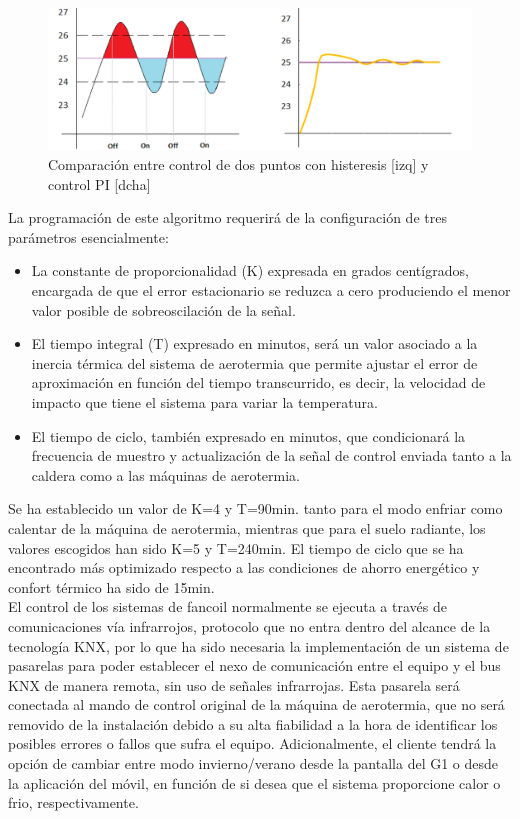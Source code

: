 \bigskip
\begin{figure}[H]
\includegraphics[width=1.15\textwidth]{figures/metodos_control.png}   
\caption{Comparación entre control de dos puntos con histeresis [izq] y control PI [dcha]}
\label{fig:metodos_control}
\end{figure}
\bigskip
La programación de este algoritmo requerirá de la configuración de tres parámetros esencialmente:
	
	\begin{itemize} 
	\item La constante de proporcionalidad (K) expresada en grados centígrados, encargada de que el error estacionario se 	reduzca a cero produciendo el menor valor posible de sobreoscilación de la señal. 
	\item El tiempo integral (T) expresado en minutos, será un valor asociado a la inercia térmica del sistema de aerotermia que 				permite ajustar el error de aproximación en función del tiempo transcurrido, es decir, la velocidad de impacto que tiene el 	sistema para variar la temperatura.
	\item El tiempo de ciclo, también expresado en minutos, que condicionará la frecuencia de muestro y actualización de la señal de 			control enviada tanto a la caldera como a las máquinas de aerotermia.
	\end{itemize} 
Se ha establecido un valor de K=4 y T=90min. tanto para el modo enfriar como calentar de la máquina de aerotermia, mientras que para el suelo radiante, los valores escogidos han sido K=5 y T=240min. El tiempo de ciclo que se ha encontrado más optimizado respecto a las condiciones de ahorro energético y confort térmico ha sido de 15min. \\
El control de los sistemas de fancoil normalmente se ejecuta a través de comunicaciones vía infrarrojos, protocolo que no entra dentro del alcance de la tecnología KNX, por lo que ha sido necesaria la implementación de un sistema de pasarelas para poder establecer el nexo de comunicación entre el equipo y el bus KNX de manera remota, sin uso de señales infrarrojas. Esta pasarela será conectada al mando de control original de la máquina de aerotermia, que no será removido de la instalación debido a su alta fiabilidad a la hora de identificar los posibles errores o fallos que sufra el equipo. Adicionalmente, el cliente tendrá la opción de cambiar entre modo invierno/verano desde la pantalla del G1 o desde la aplicación del móvil, en función de si desea que el sistema proporcione calor o frio, respectivamente.\\
